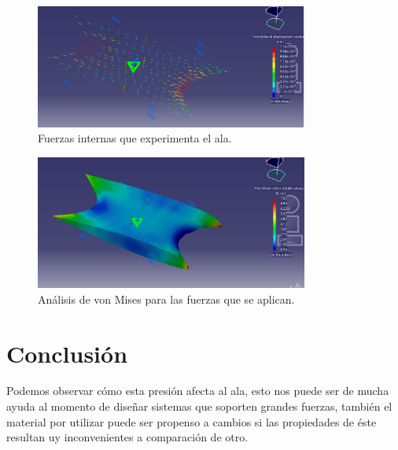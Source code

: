 \documentclass[12pt, letterpaper]{article}
\begin{document}
\begin{figure}[H]
	\centering
	\includegraphics[width=0.8\textwidth]{vector.png}
	\caption{Fuerzas internas que experimenta el ala.}
\end{figure}

\begin{figure}[H]
	\centering
	\includegraphics[width=0.8\textwidth]{vonmises.png}
	\caption{Análisis de von Mises para las fuerzas que se aplican.}
\end{figure}

\section*{Conclusión}

Podemos observar cómo esta presión afecta al ala, esto nos puede ser de mucha ayuda al momento de diseñar sistemas que soporten grandes fuerzas, también el material por utilizar puede ser propenso a cambios si las propiedades de éste resultan uy inconvenientes a comparación de otro.
\renewcommand\refname{Referencias}
\printbibliography
\end{document}
